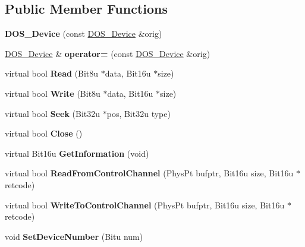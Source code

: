 \subsection*{Public Member Functions}
\begin{DoxyCompactItemize}
\item 
\hypertarget{classDOS__Device_ad955e1e07cfe5bb6c3aca63cbb897db3}{{\bfseries D\-O\-S\-\_\-\-Device} (const \hyperlink{classDOS__Device}{D\-O\-S\-\_\-\-Device} \&orig)}\label{classDOS__Device_ad955e1e07cfe5bb6c3aca63cbb897db3}

\item 
\hypertarget{classDOS__Device_aec249c3f09306a702e292a5f9f64c96b}{\hyperlink{classDOS__Device}{D\-O\-S\-\_\-\-Device} \& {\bfseries operator=} (const \hyperlink{classDOS__Device}{D\-O\-S\-\_\-\-Device} \&orig)}\label{classDOS__Device_aec249c3f09306a702e292a5f9f64c96b}

\item 
\hypertarget{classDOS__Device_adea42e56e905619e4f54f14f0ab2ee0e}{virtual bool {\bfseries Read} (Bit8u $\ast$data, Bit16u $\ast$size)}\label{classDOS__Device_adea42e56e905619e4f54f14f0ab2ee0e}

\item 
\hypertarget{classDOS__Device_a67fdc5a4134ad1be130e24a87658e066}{virtual bool {\bfseries Write} (Bit8u $\ast$data, Bit16u $\ast$size)}\label{classDOS__Device_a67fdc5a4134ad1be130e24a87658e066}

\item 
\hypertarget{classDOS__Device_a86acebec1adba82836c7900340f3eaa0}{virtual bool {\bfseries Seek} (Bit32u $\ast$pos, Bit32u type)}\label{classDOS__Device_a86acebec1adba82836c7900340f3eaa0}

\item 
\hypertarget{classDOS__Device_afb13e5cf8d6f718852798c0b78a1462c}{virtual bool {\bfseries Close} ()}\label{classDOS__Device_afb13e5cf8d6f718852798c0b78a1462c}

\item 
\hypertarget{classDOS__Device_a857abbb95538d736ebaa0d9f5a5b0b5f}{virtual Bit16u {\bfseries Get\-Information} (void)}\label{classDOS__Device_a857abbb95538d736ebaa0d9f5a5b0b5f}

\item 
\hypertarget{classDOS__Device_a435cd50e141253b4f3509cf0c4860782}{virtual bool {\bfseries Read\-From\-Control\-Channel} (Phys\-Pt bufptr, Bit16u size, Bit16u $\ast$retcode)}\label{classDOS__Device_a435cd50e141253b4f3509cf0c4860782}

\item 
\hypertarget{classDOS__Device_ae31bbed52f01100f053be09148c72b7e}{virtual bool {\bfseries Write\-To\-Control\-Channel} (Phys\-Pt bufptr, Bit16u size, Bit16u $\ast$retcode)}\label{classDOS__Device_ae31bbed52f01100f053be09148c72b7e}

\item 
\hypertarget{classDOS__Device_adf2a68f874fd5bd4ef6160dc48ef3f9d}{void {\bfseries Set\-Device\-Number} (Bitu num)}\label{classDOS__Device_adf2a68f874fd5bd4ef6160dc48ef3f9d}

\end{DoxyCompactItemize}


